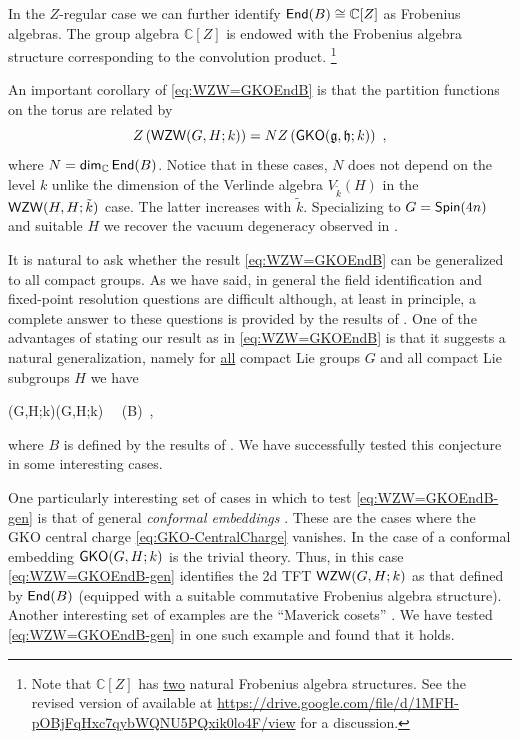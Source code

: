 \documentclass[a4paper,11pt]{article}
\newcommand{\tsf}[1]{\textsf{#1}}
\def\be{ \begin{equation} }
\def\ee{ \end{equation}}
\def\IC{\mathbb{C}}
\def\fg{\mathfrak{g}}
\def\fh{\mathfrak{h}}
\def\rem{$\clubsuit$}
\newcommand{\cran}[1]{\marginpar{\raggedright \tiny \textcolor{OliveGreen}{\rem RKS: #1 \rem}}}    %
\begin{document}
 

In the $Z$-regular case  we can further 
identify   $\mr{End}(B)\cong \IC[Z]$ as Frobenius algebras.   The group algebra $\IC[Z]$ is endowed with the Frobenius algebra structure corresponding to the convolution product. 
%
\footnote{Note that $\IC[Z]$ has \underline{two} natural Frobenius algebra structures. See 
the revised version of \cite{Moore:2025tmt} available at \url{https://drive.google.com/file/d/1MFH-pOBjFqHxc7qybWQNU5PQxik0lo4F/view}  for a discussion.   }
%
%
%
%



An important corollary of \eqref{eq:WZW=GKOEndB} is that the partition functions on the torus are related by 
%
\be\label{eq:RescaleTorus}
Z\left( \mr{WZW}(G,H;k)\right)  = N   Z \left( \mr{GKO}(\fg,\fh;k)\right)  ~,
\ee
%
where $N=\mr{dim}_{\IC}\,\mr{End}(B)$. Notice that in these cases, $N$ does not depend on the level $k$ unlike the dimension of the Verlinde algebra $V_{\tilde{k}}(H)$ in the $\mathsf{WZW}(H,H;\tilde{k})$ case. The latter  increases with $\tilde{k}$. 
Specializing to $G= \mathsf{Spin}(4n)$ and suitable $H$ we recover the vacuum degeneracy observed in  
\cite{Bardakci:1987ee,Altschuler:1987zb}. 

 It is natural to ask whether the result \eqref{eq:WZW=GKOEndB} can be generalized to
 all compact groups.  As we have said, in general  the field identification and fixed-point resolution questions are difficult although, at least in principle, a complete answer to these questions is provided by the results of \cite{Frohlich:2003hg,Frohlich:2003hm}. One of the 
advantages of stating our result as in \eqref{eq:WZW=GKOEndB} is that it suggests a natural generalization, namely for \underline{all} compact Lie groups $G$ and all compact Lie subgroups $H$ we have 
%
\begin{eqsp}\label{eq:WZW=GKOEndB-gen}
    (G,H;k)\cong {}(G,H;k) \, \widetilde{\otimes} \,  (B)~,
\end{eqsp}
%
where $B$ is defined by the results of \cite{Frohlich:2003hm,Frohlich:2003hg}. 
We have successfully tested this conjecture in some interesting cases. 

One particularly interesting set of cases in which to test \eqref{eq:WZW=GKOEndB-gen}
is that of general \emph{conformal embeddings} \cite{Schellekens:1986mb}. These are the cases where the \tsf{GKO} 
central charge \eqref{eq:GKO-CentralCharge} vanishes. 
In the case of a conformal embedding  $\mathsf{GKO}(G,H;k)$ is the trivial theory. Thus, 
in this case \eqref{eq:WZW=GKOEndB-gen} identifies the 2d \tsf{TFT}   $\mathsf{WZW}(G,H;k)$ 
as that defined by    $\mathsf{End}(B)$ (equipped with a suitable commutative Frobenius algebra structure). 
Another interesting set of examples are the ``Maverick cosets'' \cite{Dunbar:1993hr,dunbar1993characters}.  We have tested 
\eqref{eq:WZW=GKOEndB-gen} in one such example and found that it holds. 
\end{document}

